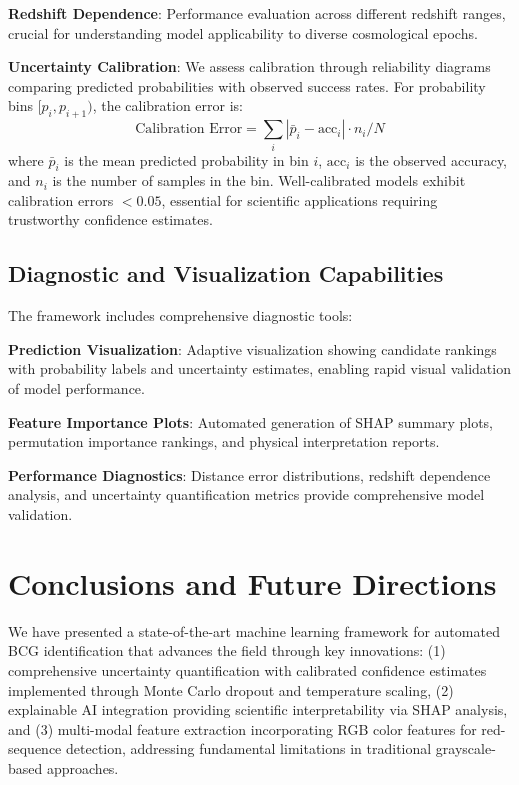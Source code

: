 \documentclass[twocolumn,10pt]{aastex631}
\begin{document}
\textbf{Redshift Dependence}: Performance evaluation across different redshift ranges, crucial for understanding model applicability to diverse cosmological epochs.

\textbf{Uncertainty Calibration}: We assess calibration through reliability diagrams comparing predicted probabilities with observed success rates. For probability bins $[p_i, p_{i+1})$, the calibration error is:
\begin{equation}
\text{Calibration Error} = \sum_{i} |\bar{p}_i - \text{acc}_i| \cdot n_i / N
\end{equation}
where $\bar{p}_i$ is the mean predicted probability in bin $i$, $\text{acc}_i$ is the observed accuracy, and $n_i$ is the number of samples in the bin. Well-calibrated models exhibit calibration errors $< 0.05$, essential for scientific applications requiring trustworthy confidence estimates.

\subsection{Diagnostic and Visualization Capabilities}

The framework includes comprehensive diagnostic tools:

\textbf{Prediction Visualization}: Adaptive visualization showing candidate rankings with probability labels and uncertainty estimates, enabling rapid visual validation of model performance.

\textbf{Feature Importance Plots}: Automated generation of SHAP summary plots, permutation importance rankings, and physical interpretation reports.

\textbf{Performance Diagnostics}: Distance error distributions, redshift dependence analysis, and uncertainty quantification metrics provide comprehensive model validation.

\section{Conclusions and Future Directions}

We have presented a state-of-the-art machine learning framework for automated BCG identification that advances the field through key innovations: (1) comprehensive uncertainty quantification with calibrated confidence estimates implemented through Monte Carlo dropout and temperature scaling, (2) explainable AI integration providing scientific interpretability via SHAP analysis, and (3) multi-modal feature extraction incorporating RGB color features for red-sequence detection, addressing fundamental limitations in traditional grayscale-based approaches.
\end{document}
